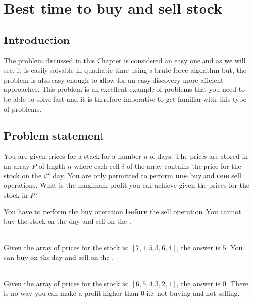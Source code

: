 %

\chapter{Best time to buy and sell stock}
\label{ch:buy_sell_stocks}
\section*{Introduction}
The problem discussed in this Chapter is considered an easy one and as we will see, it is easily solvable in quadratic time using a brute force algorithm but, the problem is also easy enough to allow for an easy discovery more efficient approaches. This problem is an excellent example of problems that you need to be able to solve fast and it is therefore imperative to get familiar with this type of problems.

\section{Problem statement}
\label{sec:buy_sell_stocks:statement1}
\begin{exercise}
You are given prices for a stack for a number $n$ of days. The prices are stored in an array $P$ of length $n$ where each cell $i$ of the array contains the price for the stock on the $i^{th}$ day. You are only permitted to perform \textbf{one} buy and \textbf{one} sell operations. What is the maximum profit you can achieve given the prices for the stock in $P$?

You have to perform the buy operation \textbf{before} the sell operation. You cannot buy the stock on the  day and sell on the .

\begin{example}
	\hfill \\
	Given the array of prices for the stock is: $[7,1,5,3,6,4]$, the answer is $5$. You can buy on the  day and sell on the .
\end{example}

\begin{example}
	\hfill \\
	Given the array of prices for the stock is: $[6,5,4,3,2,1]$, the answer is $0$. There is no way you can make a profit higher than $0$ i.e. not buying and not selling. 
\end{example}

\end{exercise}

